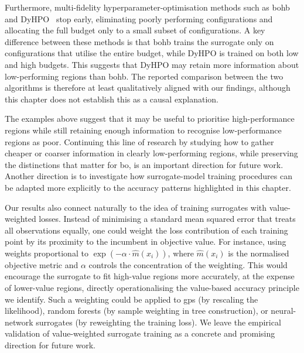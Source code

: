 Furthermore, multi-fidelity hyperparameter-optimisation methods such as \gls{bohb}~\citep{FalEtAl18} and DyHPO~\citep{WisEtAl22} stop early, eliminating poorly performing configurations and allocating the full budget only to a small subset of configurations. A key difference between these methods is that \gls{bohb} trains the surrogate only on configurations that utilise the entire budget, while DyHPO is trained on both low and high budgets. This suggests that DyHPO may retain more information about low-performing regions than \gls{bohb}. The reported comparison between the two algorithms is therefore at least qualitatively aligned with our findings, although this chapter does not establish this as a causal explanation.

The examples above suggest that it may be useful to prioritise high-performance regions while still retaining enough information to recognise low-performance regions as poor. Continuing this line of research by studying how to gather cheaper or coarser information in clearly low-performing regions, while preserving the distinctions that matter for \gls{bo}, is an important direction for future work. Another direction is to investigate how surrogate-model training procedures can be adapted more explicitly to the accuracy patterns highlighted in this chapter.

Our results also connect naturally to the idea of training surrogates with value-weighted losses. Instead of minimising a standard mean squared error that treats all observations equally, one could weight the loss contribution of each training point by its proximity to the incumbent in objective value. For instance, using weights proportional to $\exp(-\alpha \cdot \hat{m}(x_i))$, where $\hat{m}(x_i)$ is the normalised objective metric and $\alpha$ controls the concentration of the weighting. This would encourage the surrogate to fit high-value regions more accurately, at the expense of lower-value regions, directly operationalising the value-based accuracy principle we identify. Such a weighting could be applied to \glspl{gp} (by rescaling the likelihood), random forests (by sample weighting in tree construction), or neural-network surrogates (by reweighting the training loss). We leave the empirical validation of value-weighted surrogate training as a concrete and promising direction for future work.


